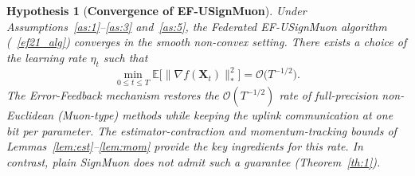 \documentclass{article}
\newtheorem{hypothesis}{Hypothesis}
\begin{document}
\begin{hypothesis}[\textbf{Convergence of EF-USignMuon}]\label{hyp:1}
Under Assumptions~\ref{as:1}--\ref{as:3} and~\ref{as:5}, the Federated EF-USignMuon algorithm (~\cref{ef21_alg}) converges in the smooth non-convex setting. There exists a choice of the learning rate $\eta_t$ such that
\begin{equation}
\min_{0 \le t \le T}\mathbb{E}\bigl[\|\nabla f(\mathbf{X}_t)\|_*^2\bigr]
= \mathcal{O}\bigl(T^{-1/2}\bigr).
\end{equation}
The Error-Feedback mechanism restores the $\mathcal{O}(T^{-1/2})$ rate of full-precision non-Euclidean (Muon-type) methods while keeping the uplink communication at one bit per parameter. The estimator-contraction and momentum-tracking bounds of Lemmas~\ref{lem:est}--\ref{lem:mom} provide the key ingredients for this rate. In contrast, plain SignMuon does not admit such a guarantee (Theorem~\ref{th:1}).
\end{hypothesis}
\end{document}
